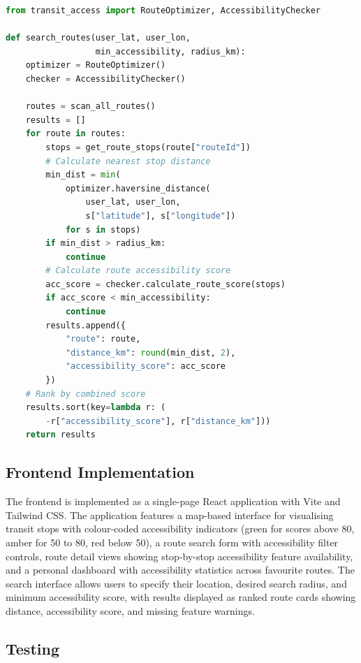 \documentclass[conference]{IEEEtran}
\begin{document}
\begin{lstlisting}[language=Python, caption={Accessibility-aware route search implementation}]
from transit_access import RouteOptimizer, AccessibilityChecker

def search_routes(user_lat, user_lon,
                  min_accessibility, radius_km):
    optimizer = RouteOptimizer()
    checker = AccessibilityChecker()

    routes = scan_all_routes()
    results = []
    for route in routes:
        stops = get_route_stops(route["routeId"])
        # Calculate nearest stop distance
        min_dist = min(
            optimizer.haversine_distance(
                user_lat, user_lon,
                s["latitude"], s["longitude"])
            for s in stops)
        if min_dist > radius_km:
            continue
        # Calculate route accessibility score
        acc_score = checker.calculate_route_score(stops)
        if acc_score < min_accessibility:
            continue
        results.append({
            "route": route,
            "distance_km": round(min_dist, 2),
            "accessibility_score": acc_score
        })
    # Rank by combined score
    results.sort(key=lambda r: (
        -r["accessibility_score"], r["distance_km"]))
    return results
\end{lstlisting}

\subsection{Frontend Implementation}

The frontend is implemented as a single-page React application with Vite and Tailwind CSS. The application features a map-based interface for visualising transit stops with colour-coded accessibility indicators (green for scores above 80, amber for 50 to 80, red below 50), a route search form with accessibility filter controls, route detail views showing stop-by-stop accessibility feature availability, and a personal dashboard with accessibility statistics across favourite routes. The search interface allows users to specify their location, desired search radius, and minimum accessibility score, with results displayed as ranked route cards showing distance, accessibility score, and missing feature warnings.

\subsection{Testing}
\end{document}
